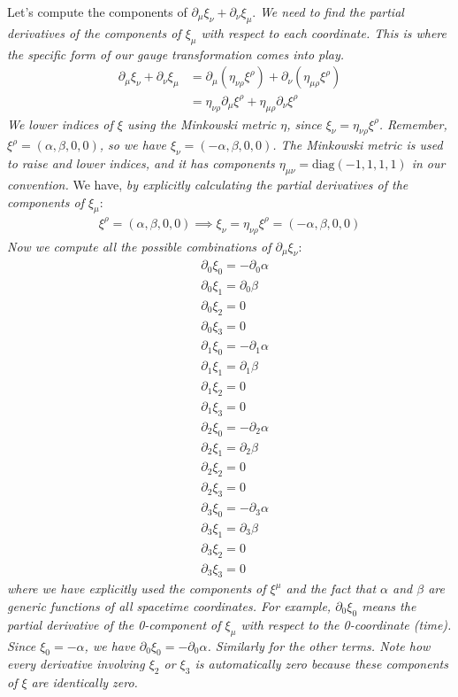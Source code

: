 \documentclass{article}
\begin{document}
Let's compute the components of $\partial_{\mu} \xi_{\nu} + \partial_{\nu} \xi_{\mu}$. \emph{We need to find the partial derivatives of the components of $\xi_{\mu}$ with respect to each coordinate. This is where the specific form of our gauge transformation comes into play.}
\begin{align*}
\partial_{\mu} \xi_{\nu} + \partial_{\nu} \xi_{\mu} &= \partial_{\mu} (\eta_{\nu \rho}\xi^{\rho}) + \partial_{\nu} (\eta_{\mu \rho}\xi^{\rho}) \\
&= \eta_{\nu \rho}\partial_{\mu} \xi^{\rho} + \eta_{\mu \rho} \partial_{\nu} \xi^{\rho}
\end{align*}
\emph{We lower indices of $\xi$ using the Minkowski metric $\eta$, since $\xi_{\nu} = \eta_{\nu\rho}\xi^{\rho}$. Remember, $\xi^{\rho}=(\alpha, \beta, 0, 0)$, so we have $\xi_{\nu}=(-\alpha, \beta, 0, 0)$. The Minkowski metric is used to raise and lower indices, and it has components $\eta_{\mu\nu} = \text{diag}(-1, 1, 1, 1)$ in our convention.}
We have, \emph{by explicitly calculating the partial derivatives of the components of $\xi_{\mu}$}:
\begin{align*}
\xi^{\rho}=(\alpha, \beta, 0, 0) \implies \xi_{\nu}=\eta_{\nu \rho}\xi^{\rho}=(-\alpha, \beta, 0, 0)
\end{align*}
\emph{Now we compute all the possible combinations of $\partial_\mu \xi_\nu$}:
\begin{align*}
&\partial_0 \xi_0 = -\partial_0 \alpha \\
&\partial_0 \xi_1 = \partial_0 \beta \\
&\partial_0 \xi_2 = 0 \\
&\partial_0 \xi_3 = 0 \\
&\partial_1 \xi_0 = -\partial_1 \alpha \\
&\partial_1 \xi_1 = \partial_1 \beta \\
&\partial_1 \xi_2 = 0 \\
&\partial_1 \xi_3 = 0 \\
&\partial_2 \xi_0 = -\partial_2 \alpha \\
&\partial_2 \xi_1 = \partial_2 \beta \\
&\partial_2 \xi_2 = 0 \\
&\partial_2 \xi_3 = 0 \\
&\partial_3 \xi_0 = -\partial_3 \alpha \\
&\partial_3 \xi_1 = \partial_3 \beta \\
&\partial_3 \xi_2 = 0 \\
&\partial_3 \xi_3 = 0
\end{align*}
\emph{where we have explicitly used the components of $\xi^{\mu}$ and the fact that $\alpha$ and $\beta$ are generic functions of all spacetime coordinates. For example, $\partial_0 \xi_0$ means the partial derivative of the 0-component of $\xi_{\mu}$ with respect to the 0-coordinate (time). Since $\xi_0 = -\alpha$, we have $\partial_0 \xi_0 = -\partial_0 \alpha$. Similarly for the other terms. Note how every derivative involving $\xi_2$ or $\xi_3$ is automatically zero because these components of $\xi$ are identically zero.}
\end{document}
